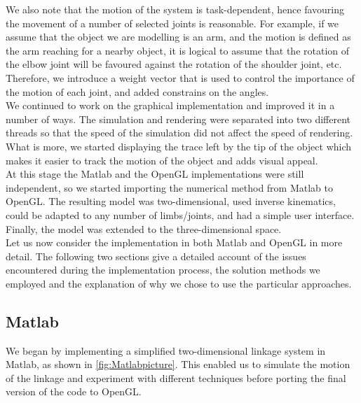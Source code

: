 \documentclass[paper=a4, fontsize=11pt]{scrartcl} %
\numberwithin{equation}{section} %
\numberwithin{figure}{section} %
\numberwithin{table}{section} %
\begin{document}
We also note that the motion of the system is task-dependent, hence favouring the movement of a number of selected joints is reasonable. For example, if we assume that the object we are modelling is an arm, and the motion is defined as the arm reaching for a nearby object, it is logical to assume that the rotation of the elbow joint will be favoured against the rotation of the shoulder joint, etc. Therefore, we introduce a weight vector that is used to control the importance of the motion of each joint, and added constrains on the angles.\\

We continued to work on the graphical implementation and improved it in a number of ways. The simulation and rendering were separated into two different threads so that the speed of the simulation did not affect the speed of rendering. What is more, we started displaying the trace left by the tip of the object which makes it easier to track the motion of the object and adds visual appeal. \\

At this stage the Matlab and the OpenGL implementations were still independent, so we started importing the numerical method from Matlab to OpenGL. The resulting model was two-dimensional, used inverse kinematics, could be adapted to any number of limbs/joints, and had a simple user interface. Finally, the model was extended to the three-dimensional space. \\

Let us now consider the implementation in both Matlab and OpenGL in more detail. The following two sections give a detailed account of the issues encountered during the implementation process, the solution methods we employed and the explanation of why we chose to use the particular approaches.

\subsection{Matlab}

We began by implementing a simplified two-dimensional linkage system in Matlab, as shown in \ref{fig:Matlabpicture}. This enabled us to simulate the motion of the linkage and experiment with different techniques before porting the final version of the code to OpenGL. \\
\end{document}

